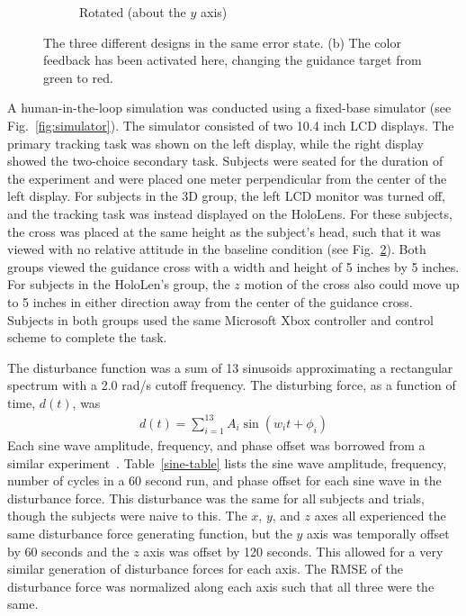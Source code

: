 \begin{figure}[t!]
\begin{center}
\begin{subfigure}{0.32\textwidth}
            \caption{Rotated (about the $y$ axis)}
            \label{fig:designs_rotated}
        \end{subfigure}
        \caption{The three different designs in the same error state.
            (b) The color feedback has been activated here, changing the guidance target from green to red.}
        \label{fig:designs}%
    \end{center}
\end{figure}

A human-in-the-loop simulation was conducted using a fixed-base simulator (see Fig.~\ref{fig:simulator}).
The simulator consisted of two 10.4 inch LCD displays.
The primary tracking task was shown on the left display, while the right display showed the two-choice secondary task.
Subjects were seated for the duration of the experiment and were placed one meter perpendicular from the center of the left display.
For subjects in the 3D group, the left LCD monitor was turned off, and the tracking task was instead displayed on the HoloLens.
For these subjects, the cross was placed at the same height as the subject's head, such that it was viewed with no relative attitude in the baseline condition (see Fig.~\ref{fig:designs}).
Both groups viewed the guidance cross with a width and height of 5 inches by 5 inches.
For subjects in the HoloLen's group, the $z$ motion of the cross also could move up to 5 inches in either direction away from the center of the guidance cross.
Subjects in both groups used the same Microsoft Xbox controller and control scheme to complete the task.

The disturbance function was a sum of 13 sinusoids approximating a rectangular spectrum with a 2.0 rad/s cutoff frequency.
The disturbing force, as a function of time, $d(t)$, was
\begin{align}
    d(t) = \sum_{i=1}^{13} A_i \sin \left( w_i t + \phi_i \right)
    \label{eq:disturbance}
\end{align}
Each sine wave amplitude, frequency, and phase offset was borrowed from a similar experiment~\citep{hess_effects_1984}.
Table~\ref{sine-table} lists the sine wave amplitude, frequency, number of cycles in a 60 second run, and phase offset for each sine wave in the disturbance force.
This disturbance was the same for all subjects and trials, though the subjects were naive to this.
The $x$, $y$, and $z$ axes all experienced the same disturbance force generating function, but the $y$ axis was temporally offset by 60 seconds and the $z$ axis was offset by 120 seconds.
This allowed for a very similar generation of disturbance forces for each axis.
The RMSE of the disturbance force was normalized along each axis such that all three were the same.

